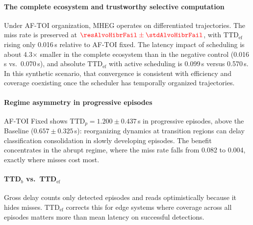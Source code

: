 \documentclass[a4paper,fleqn]{cas-dc}
\newcommand{\AFTOI}{\mbox{AF-TOI}\xspace}
\newcommand{\MHEG}{\mbox{MHEG}\xspace}
\begin{document}
\paragraph{The complete ecosystem and trustworthy selective computation}
Under \AFTOI organization, \MHEG operates on differentiated trajectories. The
miss rate is preserved at ${\color{\revcolor}\resAlvoHibrFail \pm \stdAlvoHibrFail}$, with
$\mathrm{TTD}_{\mathrm{ef}}$ rising only {\color{\revcolor}0.016}\,s relative to \AFTOI fixed. The
latency impact of scheduling is about {\color{\revcolor}4.3}$\times$ smaller in the complete
ecosystem than in the negative control {\color{\revcolor}(0.016\,s vs.\ 0.070\,s)}, and absolute
$\mathrm{TTD}_{\mathrm{ef}}$ with active scheduling is {\color{\revcolor}0.099\,s versus 0.570\,s}.
In this synthetic scenario, that convergence is consistent with efficiency and
coverage coexisting once the scheduler has temporally organized trajectories.
\paragraph{Regime asymmetry in progressive episodes}
\AFTOI Fixed shows {\color{\revcolor}$\text{TTD}_p = 1.200 \pm 0.437$}\,s in progressive episodes,
above the Baseline {\color{\revcolor}($0.657 \pm 0.325$\,s)}: reorganizing dynamics at transition
regions can delay classification consolidation in slowly developing episodes.
The benefit concentrates in the abrupt regime, where the miss rate falls from
{\color{\revcolor}0.082 to 0.004}, exactly where misses cost most.
\paragraph{TTD$_b$ vs.\ TTD$_{\mathrm{ef}}$}
Gross delay counts only detected episodes and reads optimistically because it
hides misses. $\mathrm{TTD}_{\mathrm{ef}}$ corrects this for edge systems where
coverage across all episodes matters more than mean latency on successful
detections.
\end{document}

